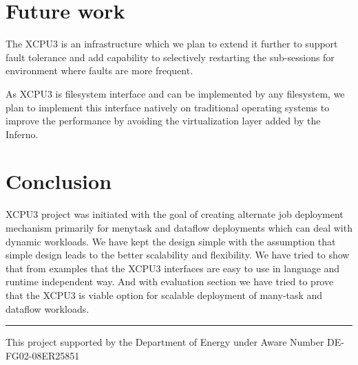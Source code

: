 \documentclass{sig-alternate}
\begin{document}
\section{Future work}
The XCPU3 is an infrastructure which we plan to extend it further to support
fault tolerance and add capability to selectively restarting the sub-sessions
for environment where faults are more frequent.

As XCPU3 is filesystem interface and can be implemented by any filesystem, we
plan to implement this interface natively on traditional operating systems to
improve the performance by avoiding the virtualization layer added by the
Inferno.

\section{Conclusion}
XCPU3 project was initiated with the goal of creating alternate job deployment
mechanism primarily for menytask and dataflow deployments which can deal with
dynamic workloads. We have kept the design simple with the assumption that
simple design leads to the better scalability and flexibility.  We have tried
to show that from examples that the XCPU3 interfaces are easy to use in
language and runtime independent way. And with evaluation section we have
tried to prove that the XCPU3 is viable option for scalable deployment of
many-task and dataflow workloads.
\newline
\newline

\hrule
This project supported by the Department of Energy under Aware Number 
DE- FG02-08ER25851


\end{document}
